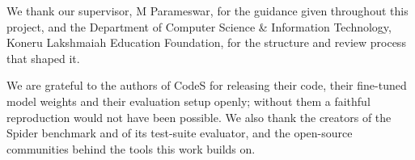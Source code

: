 We thank our supervisor, M Parameswar, for the guidance given throughout this project, and the Department of Computer Science \& Information Technology, Koneru Lakshmaiah Education Foundation, for the structure and review process that shaped it.

We are grateful to the authors of CodeS for releasing their code, their fine-tuned model weights and their evaluation setup openly; without them a faithful reproduction would not have been possible. We also thank the creators of the Spider benchmark and of its test-suite evaluator, and the open-source communities behind the tools this work builds on.
